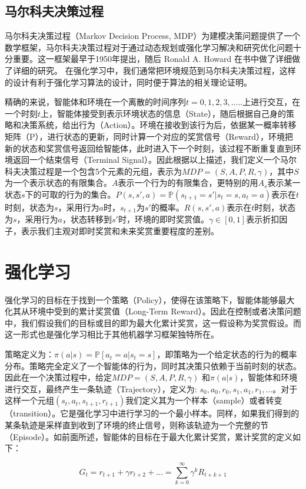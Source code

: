 \documentclass{standalone}
\begin{document}
\subsection{马尔科夫决策过程}
马尔科夫决策过程（Markov Decision Process, MDP）为建模决策问题提供了一个数学框架，马尔科夫决策过程对于通过动态规划或强化学习解决和研究优化问题十分重要。这一框架最早于1950年提出，随后 Ronald A. Howard 在书中做了详细做了详细的研究。
在强化学习中，我们通常把环境规范到马尔科夫决策过程，这样的设计有利于强化学习算法的设计，同时便于算法的相关理论证明。\par
精确的来说，智能体和环境在一个离散的时间序列$t=0,1,2,3,... ..$上进行交互，在一个时刻$t$上，智能体接受到表示环境状态的信息（State），随后根据自己身的策略和决策系统，给出行为（Action）。环境在接收到该行为后，依据某一概率转移矩阵（P），进行状态的更新，同时计算一个对应的奖赏信号（Reward），环境把新的状态和奖赏信号返回给智能体，此时进入下一个时刻，该过程不断重复直到环境返回一个结束信号（Terminal Signal）。因此根据以上描述，我们定义一个马尔科夫决策过程是一个包含5个元素的元组，表示为$MDP=(S, A, P, R, \gamma)$，其中$S$为一个表示状态的有限集合。$A$表示一个行为的有限集合，更特别的用$A_s$表示某一状态$s$下的可取的行为的集合。$P(s, s',a) = \mathbb{P}(s_{t+1} = s'|s_t = s, a_t=a)$表示在$t$时刻，状态为$s$，采用行为$a$时，$s_{t+1}$为$s'$的概率。$R(s, s', a)$表示在$t$时刻，状态为$s$，采用行为$a$，状态转移到$s'$时，环境的即时奖赏值。$\gamma \in [0, 1]$表示折扣因子，表示我们主观对即时奖赏和未来奖赏重要程度的差别。\par 

\section{强化学习}
强化学习的目标在于找到一个策略（Policy），使得在该策略下，智能体能够最大化其从环境中受到的累计奖赏值（Long-Term Reward）。因此在控制或者决策问题中，我们假设我们的目标或目的即为最大化累计奖赏，这一假设称为奖赏假设。而这一形式也是强化学习相比于其他机器学习框架独特所在。\par
策略定义为：$\pi(a|s) = \mathbb{P}[a_t=a | s_t=s]$，即策略为一个给定状态的行为的概率分布。策略完全定义了一个智能体的行为，同时其决策只依赖于当前时刻的状态。
因此在一个决策过程中，给定$MDP=(S, A, P, R, \gamma)$ 和$\pi(a|s)$，智能体和环境进行交互，最终产生一条轨迹（Trajectory），定义为: $s_0, a_0, r_0, s_1, a_1, r_1, ...$。对于这样一个元组$(s_t, a_t, s_{t+1}, r_{t+1})$我们定义其为一个样本（sample）或者转变（transition）。它是强化学习中进行学习的一个最小样本。同样，如果我们得到的某条轨迹是采样直到收到了环境的终止信号，则称该轨迹为一个完整的节（Episode）。如前面所述，智能体的目标在于最大化累计奖赏，累计奖赏的定义如下：
\begin{center}
    \begin{equation}
        G_t=r_{t+1} + \gamma r_{t+2}+... = \sum_{k=0}^{\infty}\gamma^{k}R_{t+k+1}
    \end{equation}
\end{center}
\end{document}
